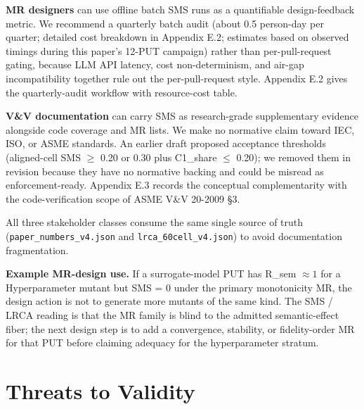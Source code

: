 \documentclass[manuscript,screen,review]{acmart}
\begin{document}
\textbf{MR designers} can use offline batch SMS runs as a quantifiable
design-feedback metric. We recommend a quarterly batch audit (about 0.5
person-day per quarter; detailed cost breakdown in Appendix E.2;
estimates based on observed timings during this paper's 12-PUT campaign)
rather than per-pull-request gating, because LLM API latency, cost
non-determinism, and air-gap incompatibility together rule out the
per-pull-request style. Appendix E.2 gives the quarterly-audit workflow
with resource-cost table.

\textbf{V\&V documentation} can carry SMS as research-grade
supplementary evidence alongside code coverage and MR lists. We make no
normative claim toward IEC, ISO, or ASME standards. An earlier draft
proposed acceptance thresholds (aligned-cell SMS $\geq$ 0.20 or 0.30 plus
C1\_share $\leq$ 0.20); we removed them in revision because they have no
normative backing and could be misread as enforcement-ready. Appendix
E.3 records the conceptual complementarity with the code-verification
scope of ASME V\&V 20-2009 §3.

All three stakeholder classes consume the same single source of truth
(\texttt{paper\_numbers\_v4.json} and \texttt{lrca\_60cell\_v4.json}) to
avoid documentation fragmentation.

\textbf{Example MR-design use.} If a surrogate-model PUT has
R\_sem $\approx 1$ for a Hyperparameter mutant but SMS = 0 under the
primary monotonicity MR, the design action is not to generate more
mutants of the same kind. The SMS / LRCA reading is that the MR family is
blind to the admitted semantic-effect fiber; the next design step is to
add a convergence, stability, or fidelity-order MR for that PUT before
claiming adequacy for the hyperparameter stratum.


\section{Threats to Validity}\label{threats-to-validity}
\end{document}
